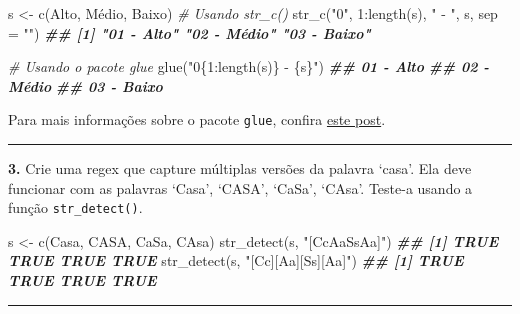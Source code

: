 \documentclass[
]{book}
\newenvironment{Shaded}{\begin{snugshade}}{\end{snugshade}}
\newcommand{\AttributeTok}[1]{\textcolor[rgb]{0.77,0.63,0.00}{#1}}
\newcommand{\CommentTok}[1]{\textcolor[rgb]{0.56,0.35,0.01}{\textit{#1}}}
\newcommand{\DecValTok}[1]{\textcolor[rgb]{0.00,0.00,0.81}{#1}}
\newcommand{\DocumentationTok}[1]{\textcolor[rgb]{0.56,0.35,0.01}{\textbf{\textit{#1}}}}
\newcommand{\FunctionTok}[1]{\textcolor[rgb]{0.00,0.00,0.00}{#1}}
\newcommand{\NormalTok}[1]{#1}
\newcommand{\OtherTok}[1]{\textcolor[rgb]{0.56,0.35,0.01}{#1}}
\newcommand{\SpecialCharTok}[1]{\textcolor[rgb]{0.00,0.00,0.00}{#1}}
\newcommand{\StringTok}[1]{\textcolor[rgb]{0.31,0.60,0.02}{#1}}
\begin{document}
\begin{Shaded}
\begin{Highlighting}[]
\NormalTok{s }\OtherTok{\textless{}{-}} \FunctionTok{c}\NormalTok{(}\StringTok{\textquotesingle{}Alto\textquotesingle{}}\NormalTok{, }\StringTok{\textquotesingle{}Médio\textquotesingle{}}\NormalTok{, }\StringTok{\textquotesingle{}Baixo\textquotesingle{}}\NormalTok{)}
\CommentTok{\# Usando str\_c()}
\FunctionTok{str\_c}\NormalTok{(}\StringTok{"0"}\NormalTok{, }\DecValTok{1}\SpecialCharTok{:}\FunctionTok{length}\NormalTok{(s), }\StringTok{" {-} "}\NormalTok{, s, }\AttributeTok{sep =} \StringTok{""}\NormalTok{)}
\DocumentationTok{\#\# [1] "01 {-} Alto"  "02 {-} Médio" "03 {-} Baixo"}

\CommentTok{\# Usando o pacote glue}
\FunctionTok{glue}\NormalTok{(}\StringTok{"0\{1:length(s)\} {-} \{s\}"}\NormalTok{)}
\DocumentationTok{\#\# 01 {-} Alto}
\DocumentationTok{\#\# 02 {-} Médio}
\DocumentationTok{\#\# 03 {-} Baixo}
\end{Highlighting}
\end{Shaded}

Para mais informações sobre o pacote \texttt{glue}, confira \href{http://curso-r.com/blog/2017/04/17/2017-04-08-glue/}{este post}.

\begin{center}\rule{0.5\linewidth}{0.5pt}\end{center}

\textbf{3.} Crie uma regex que capture múltiplas versões da palavra `casa'. Ela deve funcionar com as palavras `Casa', `CASA', `CaSa', `CAsa'. Teste-a usando a função \texttt{str\_detect()}.

\begin{Shaded}
\begin{Highlighting}[]
\NormalTok{s }\OtherTok{\textless{}{-}} \FunctionTok{c}\NormalTok{(}\StringTok{\textquotesingle{}Casa\textquotesingle{}}\NormalTok{, }\StringTok{\textquotesingle{}CASA\textquotesingle{}}\NormalTok{, }\StringTok{\textquotesingle{}CaSa\textquotesingle{}}\NormalTok{, }\StringTok{\textquotesingle{}CAsa\textquotesingle{}}\NormalTok{)}
\FunctionTok{str\_detect}\NormalTok{(s, }\StringTok{"[CcAaSsAa]"}\NormalTok{)}
\DocumentationTok{\#\# [1] TRUE TRUE TRUE TRUE}
\FunctionTok{str\_detect}\NormalTok{(s, }\StringTok{"[Cc][Aa][Ss][Aa]"}\NormalTok{)}
\DocumentationTok{\#\# [1] TRUE TRUE TRUE TRUE}
\end{Highlighting}
\end{Shaded}

\begin{center}\rule{0.5\linewidth}{0.5pt}\end{center}
\end{document}
